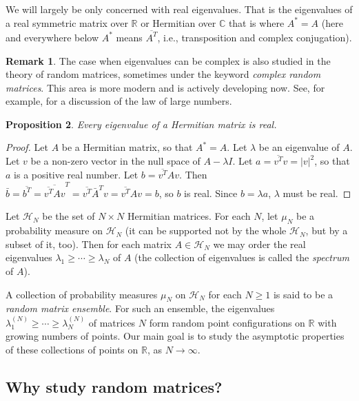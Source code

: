 \documentclass[letterpaper,11pt,oneside,reqno]{amsart}
\numberwithin{equation}{section}
\newtheorem{proposition}{Proposition}[section]
\theoremstyle{definition}
\newtheorem{remark}[proposition]{Remark}
\begin{document}
We will largely be only concerned with real eigenvalues.  That is the
eigenvalues of a real symmetric matrix over $\mathbb R$ or Hermitian over
$\mathbb C$ that is where $A^*=A$
(here and everywhere below
$A^*$ means $\overline{A^{T}}$, i.e., transposition and complex conjugation).

\begin{remark}\label{rmk:complex_eigenvalues}
	The case when eigenvalues can be complex is also studied in
	the theory of random matrices, sometimes under the keyword \emph{complex
	random matrices}. 
	This area is more modern and is actively developing now.
	See, for example, \cite{gotze2010circular} for a discussion of the law of 
	large numbers.
\end{remark}

\begin{proposition}
Every eigenvalue of a Hermitian matrix is real.
\end{proposition}
\begin{proof}
Let $A$ be a Hermitian matrix, so that $A^*=A$.
Let $\lambda$ be an eigenvalue of $A$.  Let $v$ be a non-zero vector in the null
space of $A-\lambda I$.  Let $a=\overline{ v^{T}}v=|v|^2$, so
that $a$ is a positive real number.  Let $b=\overline{ v^{T}}A
v$.  Then $\bar b=\overline{ b^{T}}=\overline{\overline{
v^{T}}Av}^{T}=\overline{
v^{T}}\bar A^{T} v=\overline{
v^{T}}Av=b$, so $b$ is real.  Since $b=\lambda a$, $\lambda$
must be real. 
\end{proof}

Let $\mathcal H_N$ be the set of $N\times N$ Hermitian matrices.  For each
$N$, let $\mu_N$ be a probability measure on $\mathcal H_N$ (it can be
supported not by  the whole $\mathcal H_N$, but by a subset of it, too).  Then
for each matrix $A\in \mathcal H_N$ we may order the real eigenvalues
$\lambda_1\geq \cdots \geq \lambda_N$ of $A$ (the collection of eigenvalues
is called the \emph{spectrum} of $A$).

A collection of probability measures $\mu_N$ on $\mathcal H_N$ for each
$N\ge1$ is said to be a \emph{random matrix ensemble}. For such an ensemble,
the eigenvalues $\lambda_1^{(N)}\geq \cdots \geq \lambda_N^{(N)}$ of matrices
$N$ form random point configurations on $\mathbb{R}$ with growing numbers of points.
Our main goal is to study the asymptotic properties of these collections of points on $\mathbb{R}$,
as $N\to\infty$.


\subsection{Why study random matrices?} %
\label{sub:why_study_random_matrices_}
\end{document}

